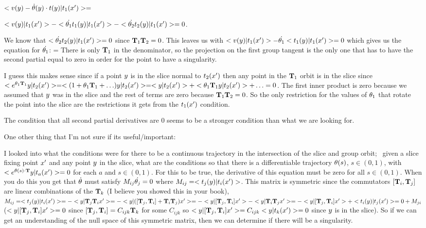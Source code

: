 \begin{description}
$<v(y)-\dot{{\bf \theta}}(y) \cdot t(y)|t_1(x')>=$

$<v(y)|t_1(x')>-<\dot{{\bf \theta}_1} t_1(y)|t_1(x')>-<\dot{{\bf \theta}_2} t_2(y)|t_1(x')>=0$.

We know that
$<\dot{{\bf \theta}_2} t_2(y)|t_1(x')>=0$ since $\mathbf{T}_1 \mathbf{T}_2=0$.
This leaves us with $<v(y)|t_1(x')>-\dot{{\bf \theta}_1}<t_1(y)|t_1(x')>=0$ which gives us the equation for $\dot{{\bf \theta}_1}$:
\beq
{}=
\eeq
There is only $\mathbf{T}_1$ in the denominator, so the projection on the first group tangent is the only one that has to have the second partial equal to zero in order for the point to have a singularity.

I guess this makes sense since if a point $y$ is in the slice normal to $t_2(x')$ then any point in the $\mathbf{T}_1$ orbit is in the slice since $<e^{{\bf \theta}_1 \mathbf{T}_1}y|t_2(x')>=<(1+{\bf \theta}_1 \mathbf{T}_1+\ldots)y|t_2(x')>=<y|t_2(x')>+<{\bf \theta}_1 \mathbf{T}_1 y|t_2(x')>+\ldots=0$. The first inner product is zero because we assumed that $y$ was in the slice and the rest of terms are zero because $\mathbf{T}_1 \mathbf{T}_2=0$. So the only restriction for the values of ${\bf \theta}_1$ that rotate the point into the slice are the restrictions it gets from the $t_1(x')$ condition.

The condition that all second partial derivatives are 0 seems to be a stronger condition than what we are looking for.

One other thing that I'm not sure if its useful/important:

I looked into what the conditions were for there to be a continuous trajectory in the intersection of the slice and group orbit; \ie\ given a slice fixing point $x'$ and any point $y$ in the slice, what are the conditions so that there is a differentiable trajectory ${\bf \theta}(s)$, $s\in(0,1)$, with $<e^{{\bf \theta}(s)\cdot \mathbf{T}}y|t_a(x')>=0$ for each $a$ and $s\in(0,1)$. For this to be true, the derivative of this equation must be zero for all $s\in(0,1)$.
When you do this you get that $\dot{{\bf \theta}}$ must satisfy $M_{ij}\dot{{\bf \theta}_j}=0$ where $M_{ij}=<t_j(y)|t_i(x')>$. This matrix is symmetric since the commutators $[\mathbf{T}_i,\mathbf{T}_j]$ are linear combinations of the $\mathbf{T}_k$ (I believe you showed this in your book), $M_{ij}=<t_j(y)|t_i(x')>=-<y|\mathbf{T}_j \mathbf{T}_i x'>=-<y|([\mathbf{T}_j,\mathbf{T}_i]+\mathbf{T}_i \mathbf{T}_j)x'>=-<y|[\mathbf{T}_j,\mathbf{T}_i]x'>-<y|\mathbf{T}_i \mathbf{T}_j x'>=-<y|[\mathbf{T}_j,\mathbf{T}_i]x'>+<t_i(y)| t_j(x')>=0+M_{ji}$ ($<y|[\mathbf{T}_j,\mathbf{T}_i]x'>=0$ since $[\mathbf{T}_j,\mathbf{T}_i]=C_{ijk}\mathbf{T}_k$ for some $C_{ijk}$ so $<y|[\mathbf{T}_j,\mathbf{T}_i]x'>=C_{ijk}<y|t_k(x')>=0$ since $y$ is in the slice).
So if we can get an understanding of the null space of this symmetric matrix, then we can determine if there will be a singularity.


\end{description}
